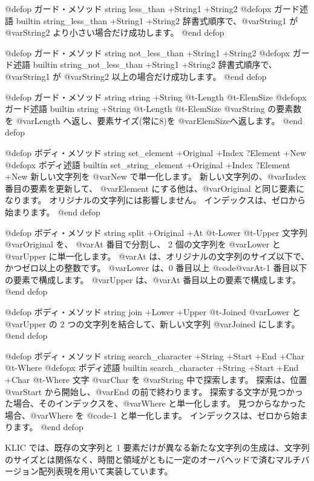 {{{{@defop {ガード・メソッド} {string} less_than +String1 +String2
@defopx {ガード述語} {builtin} string_less_than +String1 +String2
辞書式順序で、@var{String1} が@var{String2} より小さい場合だけ成功します。
@end defop

@defop {ガード・メソッド} {string} not_less_than +String1 +String2
@defopx {ガード述語} {builtin} string_not_less_than +String1 +String2
辞書式順序で、@var{String1} が @var{String2} 以上の場合だけ成功します。
@end defop

@defop {ガード・メソッド} {string} string +String @t{-}Length @t{-}ElemSize
@defopx {ガード述語} {builtin} string +String @t{-}Length @t{-}ElemSize
@var{String} の要素数を @var{Length} へ返し、要素サイズ(常に8)を @var{ElemSize}へ返します。
@end defop

@defop {ボディ・メソッド} {string} set_element +Original +Index ?Element +New
@defopx {ボディ述語} {builtin} set_string_element +Original +Index ?Element +New
新しい文字列を @var{New} で単一化します。
新しい文字列の、@var{Index} 番目の要素を更新して、 @var{Element} にする他は、@var{Original} と同じ要素になります。
オリジナルの文字列には影響しません。
インデックスは、ゼロから始まります。
@end defop

@defop {ボディ・メソッド} {string} split +Original +At @t{-}Lower @t{-}Upper
文字列 @var{Original} を、 @var{At} 番目で分割し、 2 個の文字列を @var{Lower} と @var{Upper} に単一化します。
@var{At} は、オリジナルの文字列のサイズ以下で、かつゼロ以上の整数です。
@var{Lower} は、0 番目以上 @code{@var{At}-1} 番目以下の要素で構成します。
@var{Upper} は、@var{At} 番目以上の要素で構成します。
@end defop

@defop {ボディ・メソッド} {string} join +Lower +Upper @t{-}Joined
@var{Lower} と @var{Upper} の 2 つの文字列を結合して、新しい文字列 @var{Joined} にします。
@end defop

@defop {ボディ・メソッド} {string} search_character +String +Start +End +Char @t{-}Where
@defopx {ボディ述語} {builtin} search_character +String +Start +End +Char @t{-}Where
文字 @var{Char} を @var{String} 中で探索します。
探索は、位置 @var{Start} から開始し、@var{End} の前で終わります。
探索する文字が見つかった場合、そのインデックスを、@var{Where} と単一化します。
見つからなかった場合、@var{Where} を @code{-1} と単一化します。
インデックスは、ゼロから始まります。
@end defop

KLIC では、既存の文字列と 1 要素だけが異なる新たな文字列の生成は、文字列のサイズとは関係なく、時間と領域がともに一定のオーバヘッドで済むマルチバージョン配列表現を用いて実装しています。


}}}}
